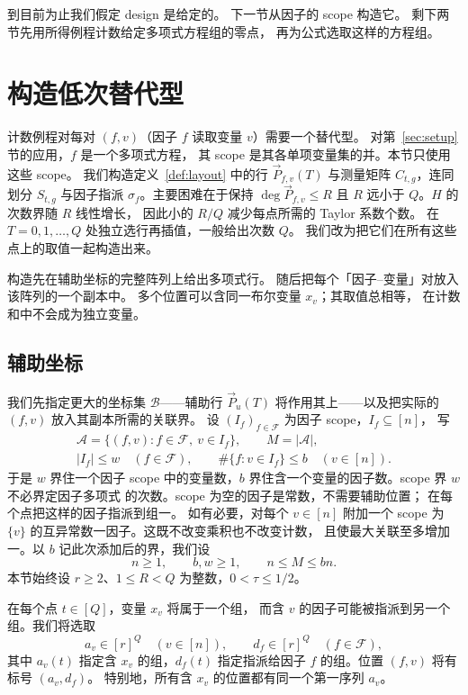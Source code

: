 \documentclass[11pt,reqno]{amsart}
\numberwithin{equation}{section}
\theoremstyle{definition}\newtheorem{definition}[theorem]{定义}
\theoremstyle{remark}\newtheorem{remark}[theorem]{注}
\renewcommand{\le}{\leqslant}
\renewcommand{\ge}{\geqslant}
\begin{document}
到目前为止我们假定 design 是给定的。
下一节从因子的 scope 构造它。
剩下两节先用所得例程计数给定多项式方程组的零点，
再为公式选取这样的方程组。
\section{构造低次替代型}\label{sec:construction}
计数例程对每对 $(f,v)$（因子 $f$ 读取变量 $v$）需要一个替代型。
对第~\ref{sec:setup} 节的应用，$f$ 是一个多项式方程，
其 scope 是其各单项变量集的并。本节只使用这些 scope。
我们构造定义~\ref{def:layout} 中的行 $\vec{P}_{f,v}(T)$
与测量矩阵 $C_{t,g}$，连同划分 $S_{t,g}$ 与因子指派
$\sigma_f$。主要困难在于保持 $\deg \vec{P}_{f,v}\le R$
且 $R$ 远小于 $Q$。$H$ 的次数界随 $R$ 线性增长，
因此小的 $R/Q$ 减少每点所需的 Taylor 系数个数。
在 $T=0,1,\ldots,Q$ 处独立选行再插值，一般给出次数 $Q$。
我们改为把它们在所有这些点上的取值一起构造出来。

构造先在辅助坐标的完整阵列上给出多项式行。
随后把每个「因子--变量」对放入该阵列的一个副本中。
多个位置可以含同一布尔变量 $x_v$；其取值总相等，
在计数和中不会成为独立变量。

\subsection{辅助坐标}\label{subsec:incidence-layout}
我们先指定更大的坐标集 $\mathcal B$——辅助行
$\vec{P}_u(T)$ 将作用其上——以及把实际的 $(f,v)$
放入其副本所需的关联界。
设 $(I_f)_{f\in\mathcal F}$ 为因子 scope，$I_f\subseteq[n]$，
写
\begin{equation}\label{eq:factor-incidences}
 \begin{gathered}
 \mathcal A=\{(f,v):f\in\mathcal F,\ v\in I_f\},\qquad M=|\mathcal A|,\\
 |I_f|\le w\quad(f\in\mathcal F),\qquad
 \#\{f:v\in I_f\}\le b\quad(v\in[n]).
 \end{gathered}
\end{equation}
于是 $w$ 界住一个因子 scope 中的变量数，$b$
界住含一个变量的因子数。scope 界 $w$ 不必界定因子多项式
的次数。scope 为空的因子是常数，不需要辅助位置；
在每个点把这样的因子指派到组一。
如有必要，对每个 $v\in[n]$ 附加一个 scope 为 $\{v\}$
的互异常数一因子。这既不改变乘积也不改变计数，
且使最大关联至多增加一。以 $b$ 记此次添加后的界，我们设
\[
 n\ge1,\qquad b,w\ge1,\qquad n\le M\le bn.
\]
本节始终设 $r\ge2$、$1\le R<Q$ 为整数，$0<\tau\le1/2$。

在每个点 $t\in[Q]$，变量 $x_v$ 将属于一个组，
而含 $v$ 的因子可能被指派到另一个组。我们将选取
\[
 a_v\in[r]^Q\quad(v\in[n]),\qquad
 d_f\in[r]^Q\quad(f\in\mathcal F),
\]
其中 $a_v(t)$ 指定含 $x_v$ 的组，$d_f(t)$ 指定指派给因子
$f$ 的组。位置 $(f,v)$ 将有标号 $(a_v,d_f)$。
特别地，所有含 $x_v$ 的位置都有同一个第一序列 $a_v$。
\end{document}
